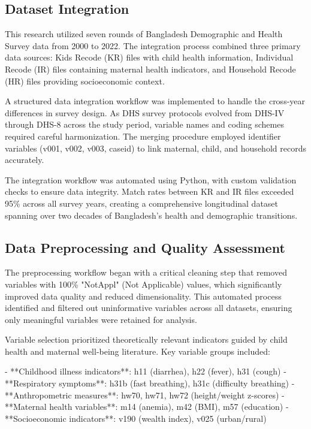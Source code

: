 \documentclass[12pt]{report}
\begin{document}
\subsection{Dataset Integration}

This research utilized seven rounds of Bangladesh Demographic and Health Survey data from 2000 to 2022. The integration process combined three primary data sources: Kids Recode (KR) files with child health information, Individual Recode (IR) files containing maternal health indicators, and Household Recode (HR) files providing socioeconomic context.

A structured data integration workflow was implemented to handle the cross-year differences in survey design. As DHS survey protocols evolved from DHS-IV through DHS-8 across the study period, variable names and coding schemes required careful harmonization. The merging procedure employed identifier variables (v001, v002, v003, caseid) to link maternal, child, and household records accurately.

The integration workflow was automated using Python, with custom validation checks to ensure data integrity. Match rates between KR and IR files exceeded 95\% across all survey years, creating a comprehensive longitudinal dataset spanning over two decades of Bangladesh's health and demographic transitions.

\subsection{Data Preprocessing and Quality Assessment}

The preprocessing workflow began with a critical cleaning step that removed variables with 100\% "NotAppl" (Not Applicable) values, which significantly improved data quality and reduced dimensionality. This automated process identified and filtered out uninformative variables across all datasets, ensuring only meaningful variables were retained for analysis.

Variable selection prioritized theoretically relevant indicators guided by child health and maternal well-being literature. Key variable groups included:

- **Childhood illness indicators**: h11 (diarrhea), h22 (fever), h31 (cough)
- **Respiratory symptoms**: h31b (fast breathing), h31c (difficulty breathing)
- **Anthropometric measures**: hw70, hw71, hw72 (height/weight z-scores)
- **Maternal health variables**: m14 (anemia), m42 (BMI), m57 (education)
- **Socioeconomic indicators**: v190 (wealth index), v025 (urban/rural)
\end{document}
